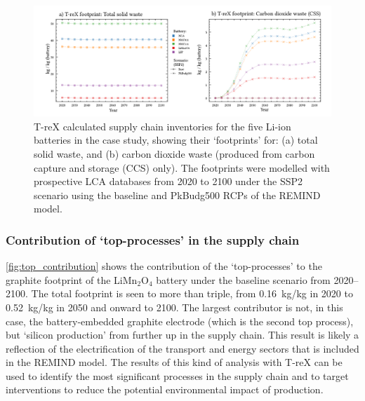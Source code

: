 \documentclass[a4paper,fleqn]{cas-dc}
\begin{document}
\begin{figure}[]
	\centering
	\includegraphics[width=1.8\columnwidth]{figures/T-reX-wastefootprint-totalANDcarbon.pdf}
	\caption{T-reX calculated supply chain inventories for the five Li-ion batteries in the case study, showing their `footprints' for: (a) total solid waste, and (b) carbon dioxide waste (produced from carbon capture and storage (CCS) only). The footprints were modelled with prospective LCA databases from 2020 to 2100 under the SSP2 scenario using the baseline and PkBudg500 RCPs of the REMIND model.}\label{fig:waste_totalANDcarbon}
\end{figure}

\subsubsection{Contribution of `top-processes' in the supply chain}%

\autoref{fig:top_contribution} shows the contribution of the `top-processes' to the graphite footprint of the  LiMn\(_2\)O\(_4\) battery under the baseline scenario from 2020--2100. The total footprint is seen to more than triple, from 0.16~kg/kg in 2020 to 0.52~kg/kg in 2050 and onward to 2100. The largest contributor is not, in this case, the battery-embedded graphite electrode (which is the second top process), but `silicon production' from further up in the supply chain. This result is likely a reflection of the electrification of the transport and energy sectors that is included in the REMIND model. The results of this kind of analysis with T-reX can be used to identify the most significant processes in the supply chain and to target interventions to reduce the potential environmental impact of production.
\end{document}
